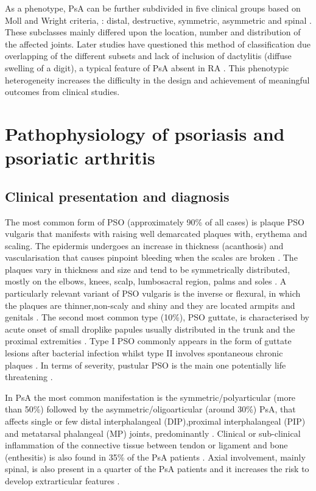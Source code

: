 As a phenotype, PsA can be further subdivided in five clinical groups based on Moll and Wright criteria, : distal, destructive, symmetric, asymmetric and spinal \parencite{Moll1973}. These subclasses mainly differed upon the location, number and distribution of the affected joints. Later studies have questioned this method of classification due overlapping of the different subsets and lack of  inclusion of dactylitis (diffuse swelling of a digit), a typical feature of PsA absent in RA \parencite{Reich2009}. This phenotypic heterogeneity increases the difficulty in the design and achievement of meaningful outcomes from clinical studies.



\section{Pathophysiology of psoriasis and psoriatic arthritis}

\subsection{Clinical presentation and diagnosis}
%

The most common form of PSO (approximately 90\% of all cases) is plaque PSO vulgaris that manifests with raising well demarcated plaques with, erythema and scaling. The epidermis undergoes an increase in thickness (acanthosis) and vascularisation that causes pinpoint bleeding when the scales are broken \parencite{Perera2012}. The plaques vary in thickness and size and tend to be symmetrically distributed, mostly on the elbows, knees, scalp, lumbosacral region, palms and soles \parencite{Griffiths2007}. A particularly relevant variant of PSO vulgaris is the inverse or flexural, in which the plaques are thinner,non-scaly and shiny and they are located armpits and genitals \parencite{Sampogna2012}. The second most common type (10\%), PSO guttate, is characterised by acute onset of small droplike papules usually distributed in the trunk and the proximal extremities \parencite{Vence2015}. Type I PSO commonly appears in the form of guttate lesions after  bacterial infection whilst type II involves spontaneous chronic plaques \parencite{Perera2012}. In terms of severity, pustular PSO is the main one potentially life threatening \parencite{Moura2015}.

In PsA the most common manifestation is the symmetric/polyarticular (more than 50\%) followed by the asymmetric/oligoarticular (around 30\%) PsA, that affects single or few distal interphalangeal (DIP),proximal interphalangeal (PIP) and metatarsal phalangeal (MP) joints, predominantly \parencite{Reich2009, McGonagle2011}. Clinical or sub-clinical inflammation of the connective tissue between tendon or ligament and bone (enthesitis) is also found in 35\% of the PsA patients \parencite {McGonagle2011,Polachek2017}. Axial involvement, mainly spinal, is also present in a quarter of the PsA patients and it increases the risk to develop extrarticular features \parencite{Jadon2016}. 

